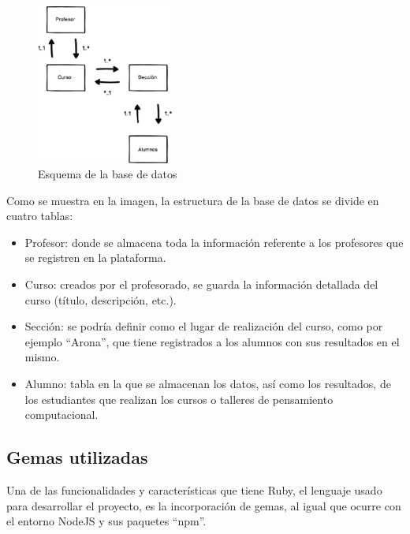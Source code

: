 \begin{figure}[!th]
\begin{center}
\includegraphics[width=0.4\textwidth]{images/base_de_datos.eps}
\caption{Esquema de la base de datos}
\label{fig:10}
\end{center}
\end{figure}

Como se muestra en la imagen, la estructura de la base de datos se divide en cuatro tablas:

\begin{itemize}
    \item Profesor: donde se almacena toda la información referente a los profesores que se registren en la plataforma.
    \item Curso: creados por el profesorado, se guarda la información detallada del curso (título, descripción, etc.).
    \item Sección: se podría definir como el lugar de realización del curso, como por ejemplo ``Arona'', que tiene registrados a los alumnos con sus resultados en el mismo.
    \item Alumno: tabla en la que se almacenan los datos, así como los resultados, de los estudiantes que realizan los cursos o talleres de pensamiento computacional.
\end{itemize}


\subsection{Gemas utilizadas}
\label{1:sec:2}

Una de las funcionalidades y características que tiene Ruby, el lenguaje usado para desarrollar el proyecto, es la incorporación de gemas, al igual que ocurre con el entorno NodeJS y sus paquetes ``npm''.

